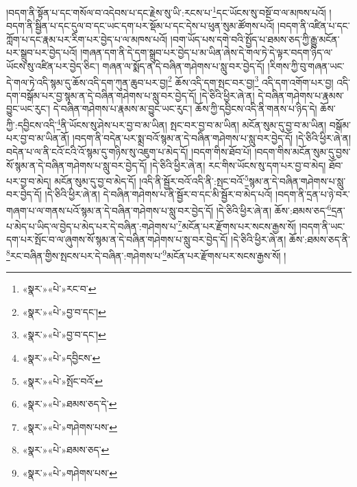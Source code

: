 །བདག་ནི་སྟོན་པ་དང་གསོལ་བ་འདེབས་པ་དང་རྗེས་སུ་ཡི་:རངས་པ་\footnote{«སྣར་»«པེ་»རང་བ་}དང་ཡོངས་སུ་བསྔོ་བ་ལ་མཁས་པའོ། །བདག་ནི་སྦྱིན་པ་དང་དུལ་བ་དང་ཡང་དག་པར་སྡོམ་པ་དང་དེས་པ་ཕུན་སུམ་ཚོགས་པའོ། །བདག་ནི་འཛིན་པ་དང་ཀློག་པ་དང་རྣམ་པར་རིག་པར་བྱེད་པ་ལ་མཁས་པའོ། །བག་ཡོད་པས་དགེ་བའི་སྤྱོད་པ་ཐམས་ཅད་ཀྱི་རྒྱུ་མངོན་པར་སྒྲུབ་པར་བྱེད་པའོ། །གཞན་དག་ནི་དེ་དག་སྒྲུབ་པར་བྱེད་པ་མ་ཡིན་ཞེས་དེ་གལ་ཏེ་དེ་ལྟར་བདག་ཉིད་ལ་ཡོངས་སུ་འཛིན་པར་བྱེད་ཅིང་། གཞན་ལ་སྨོད་ན་དེ་བཞིན་གཤེགས་པ་སླུ་བར་བྱེད་དོ། །རིགས་ཀྱི་བུ་གཞན་ཡང་དེ་གལ་ཏེ་འདི་སྙམ་དུ་ཆོས་འདི་དག་ཀུན་ཆུབ་པར་བྱ།\footnote{«སྣར་»«པེ་»བྱ་བ་དང་།} ཆོས་འདི་དག་སྤང་བར་བྱ།\footnote{«སྣར་»«པེ་»བྱ་བ་དང་།} འདི་དག་འགོག་པར་བྱ། འདི་དག་བསྒོམ་པར་བྱ་སྙམ་ན་དེ་བཞིན་གཤེགས་པ་སླུ་བར་བྱེད་དོ། །དེ་ཅིའི་ཕྱིར་ཞེ་ན། དེ་བཞིན་གཤེགས་པ་རྣམས་བྱུང་ཡང་རུང་། དེ་བཞིན་གཤེགས་པ་རྣམས་མ་བྱུང་ཡང་རུང་། ཆོས་ཀྱི་དབྱིངས་འདི་ནི་གནས་པ་ཉིད་དེ། ཆོས་ཀྱི་:དབྱིངས་འདི་\footnote{«སྣར་»«པེ་»དབྱིངས་}ནི་ཡོངས་སུ་ཤེས་པར་བྱ་བ་མ་ཡིན། སྤང་བར་བྱ་བ་མ་ཡིན། མངོན་སུམ་དུ་བྱ་བ་མ་ཡིན། བསྒོམ་པར་བྱ་བ་མ་ཡིན་ནོ། །བདག་ནི་བདེན་པར་སྨྲ་བའོ་སྙམ་ན་དེ་བཞིན་གཤེགས་པ་སླུ་བར་བྱེད་དོ། །དེ་ཅིའི་ཕྱིར་ཞེ་ན། བདེན་པ་ལ་ནི་ངའོ་ངའི་འོ་སྙམ་དུ་གཉིས་སུ་འཇུག་པ་མེད་དོ། །བདག་གིས་ཐོབ་པོ། །བདག་གིས་མངོན་སུམ་དུ་བྱས་སོ་སྙམ་ན་དེ་བཞིན་གཤེགས་པ་སླུ་བར་བྱེད་དོ། །དེ་ཅིའི་ཕྱིར་ཞེ་ན། རང་གིས་ཡོངས་སུ་དག་པར་བྱ་བ་མེད། ཐོབ་པར་བྱ་བ་མེད། མངོན་སུམ་དུ་བྱ་བ་མེད་དོ། །འདི་ནི་སྦྱོར་བའོ་འདི་ནི་:སྤང་བའོ་\footnote{«སྣར་»«པེ་»སྤོང་བའོ་}སྙམ་ན་དེ་བཞིན་གཤེགས་པ་སླུ་བར་བྱེད་དོ། །དེ་ཅིའི་ཕྱིར་ཞེ་ན། དེ་བཞིན་གཤེགས་པ་ནི་སྦྱོར་བ་དང་མི་སྦྱོར་བ་མེད་པའོ། །བདག་ནི་དྲན་པ་ཉེ་བར་གཞག་པ་ལ་གནས་པའོ་སྙམ་ན་དེ་བཞིན་གཤེགས་པ་སླུ་བར་བྱེད་དོ། །དེ་ཅིའི་ཕྱིར་ཞེ་ན། ཆོས་:ཐམས་ཅད་\footnote{«སྣར་»«པེ་»ཐམས་ཅད་དེ་}དྲན་པ་མེད་པ་ཡིད་ལ་བྱེད་པ་མེད་པར་དེ་བཞིན་:གཤེགས་པ་\footnote{«སྣར་»«པེ་»གཤེགས་པས་}མངོན་པར་རྫོགས་པར་སངས་རྒྱས་སོ། །བདག་ནི་ཡང་དག་པར་སྤོང་བ་ལ་ཞུགས་སོ་སྙམ་ན་དེ་བཞིན་གཤེགས་པ་སླུ་བར་བྱེད་དོ། །དེ་ཅིའི་ཕྱིར་ཞེ་ན། ཆོས་:ཐམས་ཅད་ནི་\footnote{«སྣར་»«པེ་»ཐམས་ཅད་}རང་བཞིན་གྱིས་སྤངས་པར་དེ་བཞིན་:གཤེགས་པ་\footnote{«སྣར་»«པེ་»གཤེགས་པས་}མངོན་པར་རྫོགས་པར་སངས་རྒྱས་སོ། །
